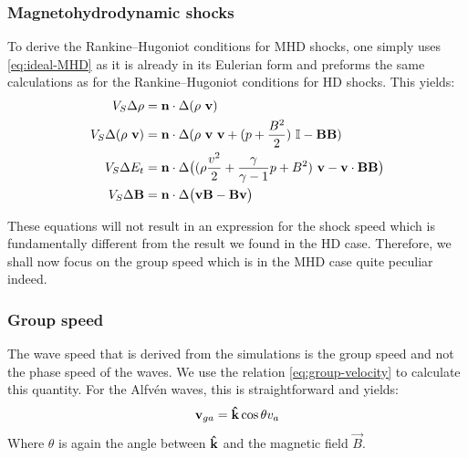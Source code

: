 \subsubsection{Magnetohydrodynamic shocks}

To derive the Rankine–Hugoniot conditions for MHD shocks, one simply uses \cref{eq:ideal-MHD} as it is already in its Eulerian form and preforms the same calculations as for the Rankine–Hugoniot conditions for HD shocks. 
This yields:
\begin{equation}
\label{eq:MHD-shock-conditions}
\begin{split}
V_S \Delta \rho &= \vec{n}\cdot\Delta(\rho \ \vec{v})\\
V_S \Delta (\rho \ \vec{v}) &= \vec{n} \cdot \Delta(\rho \ \vec{v} \ \vec{v} + (p + \frac{B^2}{2}) \ \I -  \vec{B}\vec{B}) \\
V_S \Delta E_t &= \vec{n} \cdot \Delta \big( (\rho \frac{v^2}{2} + \frac{\gamma}{\gamma - 1} p + B^2) \ \vec{v} - \vec{v} \cdot \vec{B} \vec{B} \big) \\
V_S \Delta \vec{B} &= \vec{n} \cdot \Delta \big( \vec{v} \vec{B} - \vec{B} \vec{v} \big)
\end{split}
\end{equation}

These equations will not result in an expression for the shock speed which is fundamentally different from the result we found in the HD case. Therefore, we shall now focus on the group speed which is in the MHD case quite peculiar indeed.

\subsubsection{Group speed}
The wave speed that is derived from the simulations is the group speed and not the phase speed of the waves. We use the relation \cref{eq:group-velocity} to calculate this quantity.
For the Alfvén waves, this is straightforward and yields:
\begin{equation}
	\mathbf{v}_{ga} = \mathbf{\hat{k}}\cos\theta v_a
\end{equation}
Where $\theta$ is again the angle between $\mathbf{\hat{k}}$ and the magnetic field $\vec{B}$.

